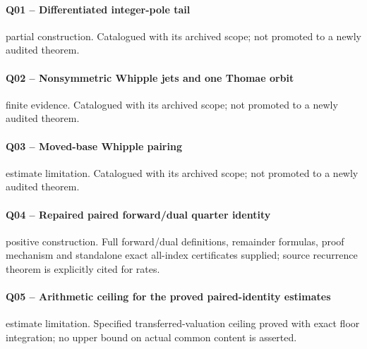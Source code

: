\paragraph{Q01 -- Differentiated integer-pole tail}\label{record-Q01}
partial construction. Catalogued with its archived scope; not promoted to a newly audited theorem.
\par\smallskip{}\par
\paragraph{Q02 -- Nonsymmetric Whipple jets and one Thomae orbit}\label{record-Q02}
finite evidence. Catalogued with its archived scope; not promoted to a newly audited theorem.
\par\smallskip{}\par
\paragraph{Q03 -- Moved-base Whipple pairing}\label{record-Q03}
estimate limitation. Catalogued with its archived scope; not promoted to a newly audited theorem.
\par\smallskip{}\par
\paragraph{Q04 -- Repaired paired forward/dual quarter identity}\label{record-Q04}
positive construction. Full forward/dual definitions, remainder formulas, proof mechanism and standalone exact all-index certificates supplied; source recurrence theorem is explicitly cited for rates.
\par\smallskip{}\par
\paragraph{Q05 -- Arithmetic ceiling for the proved paired-identity estimates}\label{record-Q05}
estimate limitation. Specified transferred-valuation ceiling proved with exact floor integration; no upper bound on actual common content is asserted.
\par\smallskip{}\par
